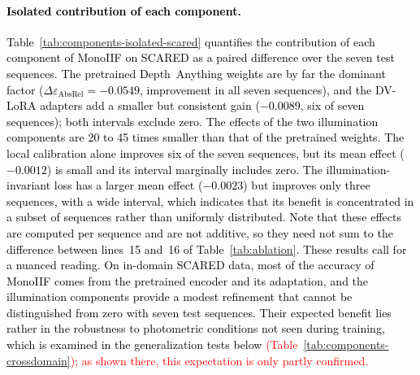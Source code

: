 \documentclass[a4paper,fleqn]{cas-dc}
\begin{document}
%
\textcolor{black}
{
\paragraph{Isolated contribution of each component.}
Table~\ref{tab:components-isolated-scared} quantifies the contribution of each component of MonoIIF on SCARED as a paired difference over the seven test sequences. The pretrained Depth~Anything weights are by far the dominant factor ($\Delta\varepsilon_\textrm{AbsRel}=-0.0549$, improvement in all seven sequences), and the DV-LoRA adapters add a smaller but consistent gain ($-0.0089$, six of seven sequences); both intervals exclude zero. The effects of the two illumination components are 20 to 45 times smaller than that of the pretrained weights. The local calibration alone improves six of the seven sequences, but its mean effect ($-0.0012$) is small and its interval marginally includes zero. The illumination-invariant loss has a larger mean effect ($-0.0023$) but improves only three sequences, with a wide interval, which indicates that its benefit is concentrated in a subset of sequences rather than uniformly distributed. 
Note that these effects are computed per sequence and are not additive, so they need not sum to the difference between lines~15 and~16 of Table~\ref{tab:ablation}.
These results call for a nuanced reading. On in-domain SCARED data, most of the accuracy of MonoIIF comes from the pretrained encoder and its adaptation, and the illumination components provide a modest refinement that cannot be distinguished from zero with seven test sequences. Their expected benefit lies rather in the robustness to photometric conditions not seen during training, which is examined in the generalization tests below \textcolor{red}{(Table~\ref{tab:components-crossdomain}); as shown there, this expectation is only partly confirmed.}}
%
\begin{table}[t]
\centering
\color{red}
\caption{\textcolor{red}{Change brought by the illumination components to the three proposed models on SCARED, computed from the values of Table~\ref{tab:ablation}: each model is compared with the configuration of the same backbone given in the second column. Relative change for the four error criteria (negative: lower error) and absolute change for $\delta_{1.25}$. Each configuration corresponds to a single training run.}}
\label{tab:components-relative}
\end{table}
\end{document}
